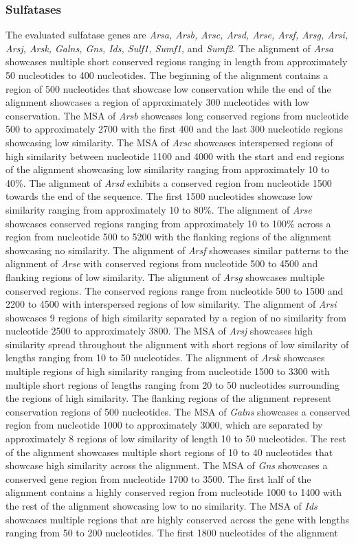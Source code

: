 \documentclass{article}
\begin{document}
\subsubsection{Sulfatases}
The evaluated sulfatase genes are \textit{Arsa, Arsb, Arsc, Arsd, Arse, Arsf, Arsg, Arsi, Arsj, Arsk, Galns, Gns, Ids, Sulf1, Sumf1,} and \textit{Sumf2}. The alignment of \textit{Arsa} showcases multiple short conserved regions ranging in length from approximately 50 nucleotides  to 400 nucleotides. The beginning of the alignment contains a region of 500 nucleotides that showcase low conservation while the end of the alignment showcases a region of approximately 300 nucleotides with low conservation. The MSA of \textit{Arsb} showcases long conserved regions from nucleotide 500 to approximately 2700 with the first 400 and the last 300 nucleotide regions showcasing low similarity. The MSA of \textit{Arsc} showcases interspersed regions of high similarity between nucleotide 1100 and 4000 with the start and end regions of the alignment showcasing low similarity ranging from approximately 10 to 40\%. The alignment of \textit{Arsd} exhibits a conserved region from nucleotide 1500 towards the end of the sequence. The first 1500 nucleotides showcase low similarity ranging from approximately 10 to 80\%. The alignment of \textit{Arse} showcases conserved regions ranging from approximately 10 to 100\% across a region from nucleotide 500 to 5200 with the flanking regions of the alignment showcasing no similarity. The alignment of \textit{Arsf} showcases similar patterns to the alignment of \textit{Arse} with conserved regions from nucleotide 500 to 4500 and flanking regions of low similarity. The alignment of \textit{Arsg} showcases multiple conserved regions. The conserved regions range from nucleotide 500 to 1500 and 2200 to 4500 with interspersed regions of low similarity. The alignment of \textit{Arsi} showcases 9 regions of high similarity separated by a region of no similarity from nucleotide 2500 to approximately 3800. The MSA of \textit{Arsj} showcases high similarity spread throughout the alignment with short regions of low similarity of lengths ranging from 10 to 50 nucleotides. The alignment of \textit{Arsk} showcases multiple regions of high similarity ranging from nucleotide 1500 to 3300 with multiple short regions of lengths ranging from 20 to 50 nucleotides surrounding the regions of high similarity. The flanking regions of the alignment represent conservation regions of 500 nucleotides. The MSA of \textit{Galns} showcases a conserved region from nucleotide 1000 to approximately 3000, which are separated by approximately 8 regions of low similarity of length 10 to 50 nucleotides. The rest of the alignment showcases multiple short regions of 10 to 40 nucleotides that showcase high similarity across the alignment. The MSA of \textit{Gns} showcases a conserved gene region from nucleotide 1700 to 3500. The first half of the alignment contains a highly conserved region from nucleotide 1000 to 1400 with the rest of the alignment showcasing low to no similarity. The MSA of \textit{Ids} showcases multiple regions that are highly conserved across the gene with lengths ranging from 50 to 200 nucleotides. The first 1800 nucleotides of the alignment 
\end{document}
